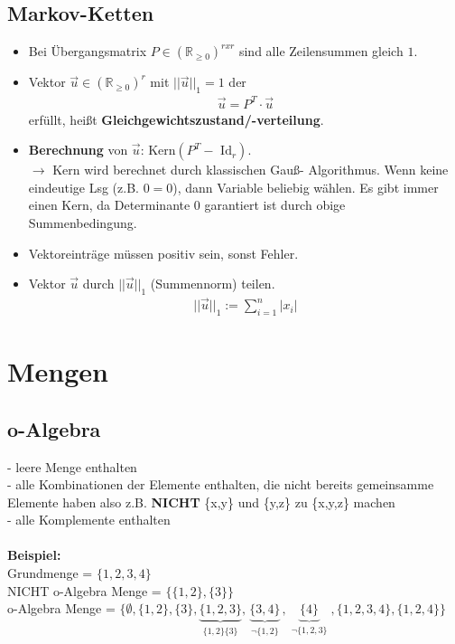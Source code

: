 \documentclass{article}
\begin{document}
\subsection{Markov-Ketten}
\begin{itemize}
	\item Bei Übergangsmatrix $P \in (\mathbb{R}_{\geq 0})^{r x r}$ sind alle Zeilensummen gleich $1$.
	\item Vektor $\vec{u} \in (\mathbb{R}_{\geq 0})^{r}$ mit $||\vec{u}||_1 = 1$
		der
		\begin{align}
			\vec{u} = P^T \cdot \vec{u}
		\end{align}
		erfüllt, heißt \textbf{Gleichgewichtszustand/-verteilung}.
	\item \textbf{Berechnung} von $\vec{u}$: $\text{Kern}(P^T - \text{ Id}_r)$.\\$\rightarrow$
		Kern wird berechnet durch klassischen Gauß- Algorithmus. Wenn keine
		eindeutige Lsg (z.B. $0 = 0$), dann Variable beliebig wählen. Es gibt
		immer einen Kern, da Determinante $0$ garantiert ist durch obige\\
		Summenbedingung.
	\item Vektoreinträge müssen positiv sein, sonst Fehler.
	\item Vektor $\vec{u}$ durch $||\vec{u}||_1$ (Summennorm) teilen.
		\begin{align}
			||\vec{u}||_1 := \sum^n_{i=1}|x_i|
		\end{align}
\end{itemize}
\section{Mengen}
\subsection{o-Algebra}
- leere Menge enthalten\\
- alle Kombinationen der Elemente enthalten, die nicht bereits gemeinsamme Elemente haben also z.B. \textbf{NICHT} \{x,y\} und \{y,z\} zu \{x,y,z\} machen\\
- alle Komplemente enthalten\\ \\
\textbf{Beispiel:}\\
Grundmenge = $\{1,2,3,4\}$\\
NICHT o-Algebra Menge = $\{\{1,2\},\{3\}\}$\\
o-Algebra Menge = $\{\emptyset ,\{1,2\},\{3\},
	\underbrace{\{1,2,3\}}_{\substack{\{1,2\}\{3\}}},
	\underbrace{\{3,4\}}_{\substack{\neg \{1,2\}}},
	\underbrace{\{4\}}_{\substack{\neg \{1,2,3\}}},
\{1,2,3,4\},\{1,2,4\}\}$
\end{document}
